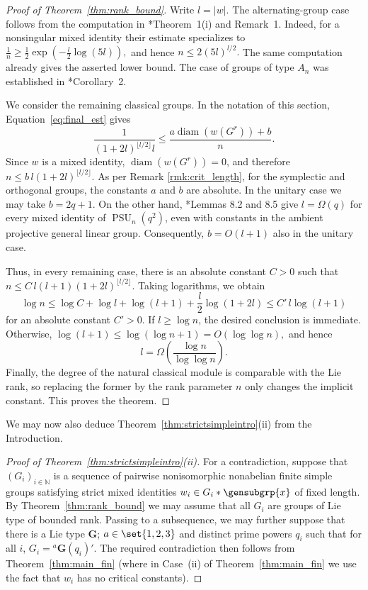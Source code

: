 \documentclass[a4paper,12pt]{amsproc}
\newcommand{\norm}[1]{\left\lvert#1\right\rvert}%
\DeclareMathOperator{\diam}{diam}%
\DeclareMathOperator{\PSU}{PSU}%
\theoremstyle{plain}
\theoremstyle{definition}
\begin{document}
\begin{proof}[Proof of Theorem~\ref{thm:rank_bound}]
Write $l=\norm{w}$. The alternating-group case follows from the
computation in
\cite{schneiderthom2022word}*{Theorem~1(i) and Remark~1}.
Indeed, for a nonsingular mixed identity their estimate specializes to
$
 \frac{1}{n}
 \geq
 \frac{1}{2}
 \exp\left(-\frac{l}{2}\log(5l)\right),
$
and hence
$
 n\leq 2(5l)^{l/2}.
$
The same computation already gives the asserted lower bound. The case
of groups of type $A_n$ was established in
\cite{bradfordschneiderthom2023non}*{Corollary~2}.

We consider the remaining classical groups. In the notation of this
section, Equation~\eqref{eq:final_est} gives
\[
 \frac{1}
 {(1+2l)^{\lfloor l/2\rfloor}l}
 \leq
 \frac{a\diam(w(G^r))+b}{n}.
\]
Since $w$ is a mixed identity, $\diam(w(G^r))=0$, and therefore
$n\leq b\,l(1+2l)^{\lfloor l/2\rfloor}.$
As per Remark \ref{rmk:crit_length}, for the symplectic and orthogonal groups, the constants $a$ and $b$ are
absolute. In the unitary case we may take $b=2q+1$. On the other hand,
\cite{bradfordschneiderthom2023length}*{Lemmas 8.2 and 8.5} give
$l=\Omega(q)$ for every mixed identity of $\PSU_n(q^2)$, even with
constants in the ambient projective general linear group. Consequently,
$b=O(l+1)$ also in the unitary case.

Thus, in every remaining case, there is an absolute constant $C>0$
such that
$
 n\leq C\,l(l+1)(1+2l)^{\lfloor l/2\rfloor}.
$
Taking logarithms, we obtain
\[
 \log n
 \leq
 \log C+\log l+\log(l+1)
 +\frac{l}{2}\log(1+2l)
 \leq C'\,l\log(l+1)
\]
for an absolute constant $C'>0$. If $l\geq\log n$, the desired
conclusion is immediate. Otherwise,
$
 \log(l+1)\leq\log(\log n+1)=O(\log\log n),
$
and hence
\[
 l=\Omega\left(\frac{\log n}{\log\log n}\right).
\]
Finally, the degree of the natural classical module is comparable with
the Lie rank, so replacing the former by the rank parameter $n$ only
changes the implicit constant. This proves the theorem.
\end{proof}

We may now also deduce Theorem~\ref{thm:strictsimpleintro}(ii) from the Introduction.

\begin{proof}[Proof of Theorem~\ref{thm:strictsimpleintro}(ii)]
    For a contradiction, suppose that $(G_i)_{i\in\mathbb{N}}$ is a sequence 
    of pairwise nonisomorphic nonabelian finite 
    simple groups satisfying strict mixed identities $w_i \in G_i \ast \gensubgrp{x}$ 
    of fixed length. 
    By Theorem~\ref{thm:rank_bound} we may assume that all $G_i$ 
    are groups of Lie type of bounded rank. 
    Passing to a subsequence, we may further suppose that there is 
    a Lie type $\mathbf{G}$; $a \in \set{1,2,3}$ and distinct prime powers 
    $q_i$ such that for all $i$, $G_i = {}^a \mathbf{G}(q_i)'$. 
    The required contradiction then follows from Theorem~\ref{thm:main_fin} 
    (where in Case~(ii) of Theorem~\ref{thm:main_fin} we use the fact that $w_i$ 
    has no critical constants). 
\end{proof}
    
\end{document}

